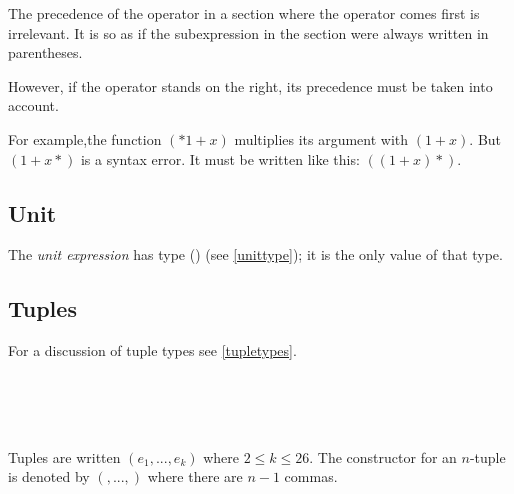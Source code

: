 The precedence of the operator in a section where the operator comes first is irrelevant. It is so as if the subexpression in the section were always written in parentheses.

However, if the operator stands on the right, its precedence must be taken into account.

For example,the function $(*1+x)$ multiplies its argument with $(1+x)$. But $(1+x*)$ is a syntax error. It must be written like this: $((1+x)*)$.

\subsection{Unit}

The \emph{unit expression} \sym{()} has type () (see \autoref{unittype}); it is the only value of that type.

\subsection{Tuples} \label{tupleterm} 

For a discussion of tuple types see \autoref{tupletypes}.

\begin{flushleft}
  \oder{}  \oder{} \\
 \sym{(,}\some{\sym{,}}\sym{)}\\
 \sym{(}\sym{,} \sym{)}\\
 \sym{(}\sym{;} \sym{)}
\end{flushleft}

Tuples are written $(e_1, ..., e_k)$ where $2\le k \le 26$.
The constructor for an $n$-tuple is denoted by $(,...,)$ where there are $n-1$ commas.

